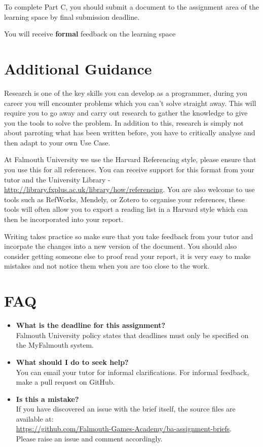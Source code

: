 \documentclass{../fal_assignment}
\begin{document}
To complete Part C, you should submit a document to the assignment area of the learning space by final submission deadline.

You will receive \textbf{formal} feedback on the learning space

\section*{Additional Guidance}
Research is one of the key skills you can develop as a programmer, during you career you will encounter problems which you can't solve straight away. This will require you to go away and carry out research to gather the knowledge to give you the tools to solve the problem. In addition to this, research is simply not about parroting what has been written before, you have to critically analyse and then adapt to your own Use Case.

At Falmouth University we use the Harvard Referencing style, please ensure that you use this  for all references. You can receive support for this format from your tutor and the University Library - \url{http://library.fxplus.ac.uk/library/how/referencing}. You are also welcome to use tools such as RefWorks, Mendely, or Zotero to organise your references, these tools will often allow you to export a reading list in a Harvard style which can then be incorporated into your report.

Writing takes practice so make sure that you take feedback from your tutor and incorpate the changes into a new version of the document. You should also consider getting someone else to proof read your report, it is very easy to make mistakes and not notice them when you are too close to the work.

\section*{FAQ}

\begin{itemize}
	\item 	\textbf{What is the deadline for this assignment?} \\ 
    		Falmouth University policy states that deadlines must only be specified on the MyFalmouth system.
    		
	\item 	\textbf{What should I do to seek help?} \\ 
    		You can email your tutor for informal clarifications. For informal feedback, make a pull request on GitHub. 
    		
    	\item 	\textbf{Is this a mistake?} \\ 	
    		If you have discovered an issue with the brief itself, the source files are available at: \\
    		\url{https://github.com/Falmouth-Games-Academy/ba-assignment-briefs}.\\
    		 Please raise an issue and comment accordingly.
\end{itemize}
\end{document}
